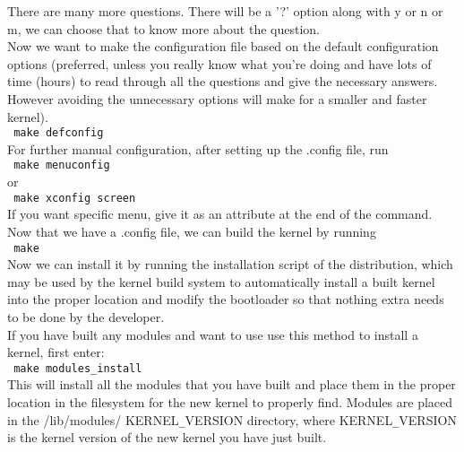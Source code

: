 \documentclass[12pt,a4paper]{article}
\begin{document}
\newline
There are many more questions. There will be a '?' option along with y or n or m, we can choose that to know more about the question.\\
\newline
Now we want to make the configuration file based on the default configuration options (preferred, unless you really know what you're doing and have lots of time (hours) to read through all the questions and give the necessary answers. However avoiding the unnecessary options will make for a smaller and faster kernel).\\
\newline
\texttt{\ make defconfig}\\
\newline
For further manual configuration, after setting up the .config file, run\\
\newline
\texttt{\ make menuconfig}\\
\newline
or\\
\newline
\texttt{\ make xconfig screen}\\
\newline
If you want specific menu, give it as an attribute at the end of the command.\\
\newline
Now that we have a .config file, we can build the kernel by running\\
\newline
\texttt{\ make}\\
\newline
Now we can install it by running the installation script of the distribution, which may be used by the kernel build system to automatically install a built kernel into the proper location and modify the bootloader so that nothing extra needs to be done by the developer.\\
\newline
If you have built any modules and want to use use this method to install a kernel, first enter:\\
\newline
\texttt{\ make modules\texttt{\_}install}\\
\newline
This will install all the modules that you have built and place them in the proper location in the filesystem for the new kernel to properly find. Modules are placed in the /lib/modules/ KERNEL\texttt{\_}VERSION directory, where KERNEL\texttt{\_}VERSION is the kernel version of the new kernel you have just built.\\
\end{document}
